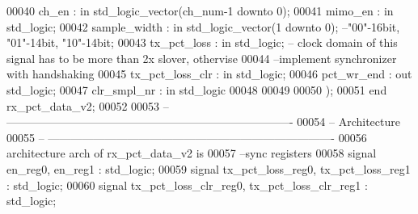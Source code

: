\begin{DoxyCode}
00040         \textcolor{vhdlchar}{ch_en}           \textcolor{vhdlchar}{:} \textcolor{keywordflow}{in} \textcolor{comment}{std\_logic\_vector}\textcolor{vhdlchar}{(}\textcolor{vhdlchar}{ch_num}\textcolor{vhdlchar}{-}\textcolor{vhdllogic}{}\textcolor{vhdllogic}{1} \textcolor{keywordflow}{downto} \textcolor{vhdllogic}{}\textcolor{vhdllogic}{0}\textcolor{vhdlchar}{)};
00041         \textcolor{vhdlchar}{mimo_en}         \textcolor{vhdlchar}{:} \textcolor{keywordflow}{in} \textcolor{comment}{std\_logic};
00042         \textcolor{vhdlchar}{sample_width}    \textcolor{vhdlchar}{:} \textcolor{keywordflow}{in} \textcolor{comment}{std\_logic\_vector}\textcolor{vhdlchar}{(}\textcolor{vhdllogic}{}\textcolor{vhdllogic}{1} \textcolor{keywordflow}{downto} \textcolor{vhdllogic}{}\textcolor{vhdllogic}{0}\textcolor{vhdlchar}{)};\textcolor{keyword}{ --"00"-16bit, "01"-14bit, "10"-14bit;}
00043         \textcolor{vhdlchar}{tx_pct_loss}     \textcolor{vhdlchar}{:} \textcolor{keywordflow}{in} \textcolor{comment}{std\_logic};\textcolor{keyword}{ -- clock domain of this signal has to be more than 2x slover,
       othervise }
00044 \textcolor{keyword}{                                       --implement synchronizer with handshaking}
00045         \textcolor{vhdlchar}{tx_pct_loss_clr} \textcolor{vhdlchar}{:} \textcolor{keywordflow}{in} \textcolor{comment}{std\_logic};
00046           \textcolor{vhdlchar}{pct_wr_end}        \textcolor{vhdlchar}{:} \textcolor{keywordflow}{out} \textcolor{comment}{std\_logic};
00047           \textcolor{vhdlchar}{clr_smpl_nr}       \textcolor{vhdlchar}{:} \textcolor{keywordflow}{in} \textcolor{comment}{std\_logic}
00048         
00049         
00050         \textcolor{vhdlchar}{)};
00051 \textcolor{keywordflow}{end} \textcolor{vhdlchar}{rx\_pct\_data\_v2};
00052 
00053 \textcolor{keyword}{-- ----------------------------------------------------------------------------}
00054 \textcolor{keyword}{-- Architecture}
00055 \textcolor{keyword}{-- ----------------------------------------------------------------------------}
00056 \textcolor{keywordflow}{architecture} arch \textcolor{keywordflow}{of} rx_pct_data_v2 is
00057 \textcolor{keyword}{--sync registers}
00058 \textcolor{keywordflow}{signal} \textcolor{vhdlchar}{en_reg0}\textcolor{vhdlchar}{,} \textcolor{vhdlchar}{en_reg1} \textcolor{vhdlchar}{:} \textcolor{comment}{std\_logic};
00059 \textcolor{keywordflow}{signal} \textcolor{vhdlchar}{tx_pct_loss_reg0}\textcolor{vhdlchar}{,} \textcolor{vhdlchar}{tx_pct_loss_reg1} \textcolor{vhdlchar}{:} \textcolor{comment}{std\_logic};
00060 \textcolor{keywordflow}{signal} \textcolor{vhdlchar}{tx_pct_loss_clr_reg0}\textcolor{vhdlchar}{,} \textcolor{vhdlchar}{tx_pct_loss_clr_reg1} \textcolor{vhdlchar}{:} \textcolor{comment}{std\_logic};

\end{DoxyCode}
